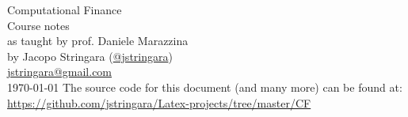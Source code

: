 \begin{titlepage}
    \begin{center}
        \vspace*{\fill}
        \Huge
        Computational Finance\\
        \vspace{0.5em}
        \Large
        Course notes\\
        as taught by prof. Daniele Marazzina \\
        \vspace{0.5em}
        by Jacopo Stringara (\href{https://github.com/jstringara}{@jstringara})\\
        \vspace{0.5em}
        \href{mailto:jstringara@gmail.com}{jstringara@gmail.com} \\
        \vspace{0.5em}
        \today
        \vfill
        The source code for this document (and many more) can be found at:\\
        \href{https://github.com/jstringara/Latex-projects/tree/master/CF}
        {https://github.com/jstringara/Latex-projects/tree/master/CF}
    \end{center}
\end{titlepage}
